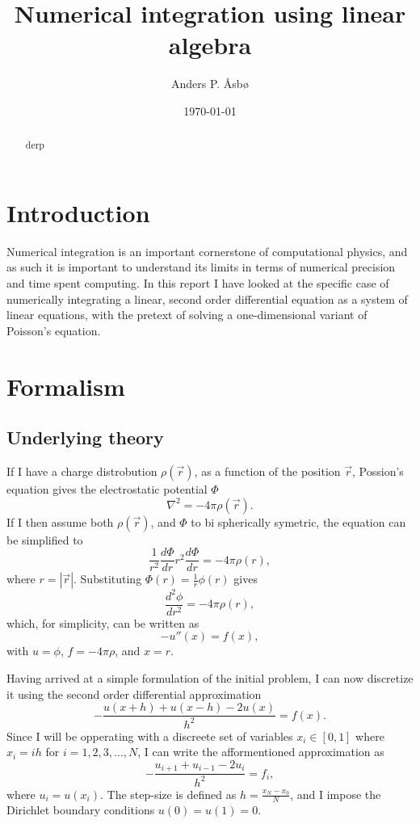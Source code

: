 \documentclass[english,notitlepage]{revtex4-1}  %
\begin{document}
\title{Numerical integration using linear algebra}   %
\author{Anders P. Åsbø}               %
\date{\today}
\noaffiliation                            %

\begin{abstract}
derp
\end{abstract}

\maketitle
\tableofcontents

\section{Introduction}\label{sec:1}
Numerical integration is an important cornerstone of computational physics, and as such it is important to understand its limits in terms of numerical precision and time spent computing. In this report I have looked at the specific case of numerically integrating a linear, second order differential equation as a system of linear equations, with the pretext of solving a one-dimensional variant of Poisson's equation.

\section{Formalism}\label{sec:2}
\subsection{Underlying theory}\label{subsec:21}
If I have a charge distrobution \(\rho(\vec{r})\), as a function of the position \(\vec{r}\), Possion's equation gives the electrostatic potential \(\Phi\)
$$
	\nabla^{2}=-4\pi\rho(\vec{r}).
$$
If I then assume both \(\rho(\vec{r})\), and \(\Phi\) to bi spherically symetric, the equation can be simplified to
$$
	\frac{1}{r^{2}}\frac{d\Phi}{dr}r^{2}\frac{d\Phi}{dr}=-4\pi\rho(r),
$$
where \(r=|\vec{r}|\). Substituting \(\Phi(r)=\frac{1}{r}\phi(r)\) gives
$$
	\frac{d^{2}\phi}{dr^{2}}=-4\pi\rho(r),
$$
which, for simplicity, can be written as
$$
	-u''(x)=f(x),
$$
with \(u = \phi\), \(f=-4\pi\rho\), and \(x = r\).

Having arrived at a simple formulation of the initial problem, I can now discretize it using the second order differential approximation
$$
	-\frac{u(x+h)+u(x-h)-2u(x)}{h^{2}}=f(x).
$$
Since I will be opperating with a discreete set of variables \(x_{i}\in[0,1]\) where \(x_{i}=ih\) for \(i=1,2,3,...,N\), I can write the afformentioned approximation as
$$
	-\frac{u_{i+1}+u_{i-1}-2u_{i}}{h^{2}}=f_{i},
$$
where \(u_{i}=u(x_{i})\). The step-size is defined as \(h=\frac{x_{N}-x_{0}}{N}\), and I impose the Dirichlet boundary conditions \(u(0)=u(1)=0\).
\end{document}
